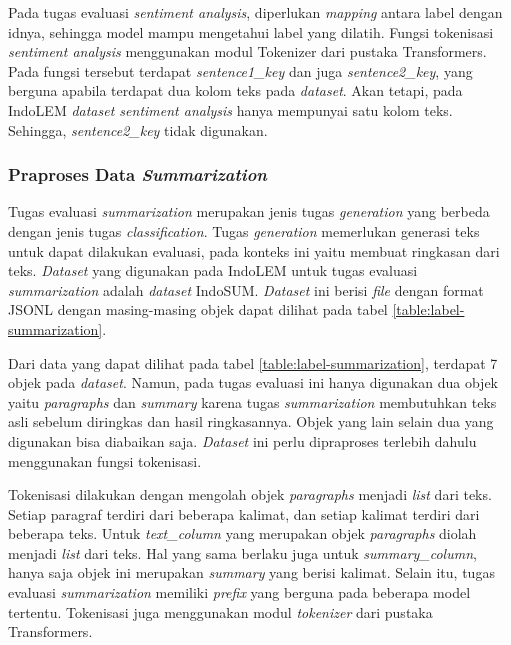 Pada tugas evaluasi \textit{sentiment analysis}, diperlukan \textit{mapping} antara label dengan idnya, sehingga model mampu mengetahui label yang dilatih. Fungsi tokenisasi \textit{sentiment analysis} menggunakan modul Tokenizer dari pustaka Transformers. Pada fungsi tersebut terdapat \textit{sentence1\_key} dan juga \textit{sentence2\_key}, yang berguna apabila terdapat dua kolom teks pada \textit{dataset}. Akan tetapi, pada IndoLEM \textit{dataset sentiment analysis} hanya mempunyai satu kolom teks. Sehingga, \textit{sentence2\_key} tidak digunakan. 

\subsubsection{Praproses Data \textit{Summarization}}

Tugas evaluasi \textit{summarization} merupakan jenis tugas \textit{generation} yang berbeda dengan jenis tugas \textit{classification}. Tugas \textit{generation} memerlukan generasi teks untuk dapat dilakukan evaluasi, pada konteks ini yaitu membuat ringkasan dari teks. \textit{Dataset} yang digunakan pada IndoLEM untuk tugas evaluasi \textit{summarization} adalah \textit{dataset} IndoSUM. \textit{Dataset} ini berisi \textit{file} dengan format JSONL dengan masing-masing objek dapat dilihat pada tabel \ref{table:label-summarization}.

Dari data yang dapat dilihat pada tabel \ref{table:label-summarization}, terdapat 7 objek  pada \textit{dataset}. Namun, pada tugas evaluasi ini hanya  digunakan dua objek yaitu \textit{paragraphs} dan \textit{summary} karena tugas \textit{summarization} membutuhkan teks asli sebelum diringkas dan hasil ringkasannya. Objek yang lain selain dua yang digunakan bisa diabaikan saja. \textit{Dataset} ini perlu dipraproses terlebih dahulu menggunakan fungsi tokenisasi.

Tokenisasi dilakukan dengan mengolah objek \textit{paragraphs} menjadi \textit{list} dari teks. Setiap paragraf terdiri dari beberapa kalimat, dan setiap kalimat terdiri dari beberapa teks. Untuk \textit{text\_column} yang merupakan objek \textit{paragraphs}  diolah menjadi \textit{list} dari teks. Hal yang sama berlaku juga untuk \textit{summary\_column}, hanya saja objek ini merupakan \textit{summary} yang berisi kalimat. Selain itu, tugas evaluasi \textit{summarization} memiliki \textit{prefix} yang berguna pada beberapa model tertentu. Tokenisasi juga menggunakan modul \textit{tokenizer} dari pustaka Transformers.

